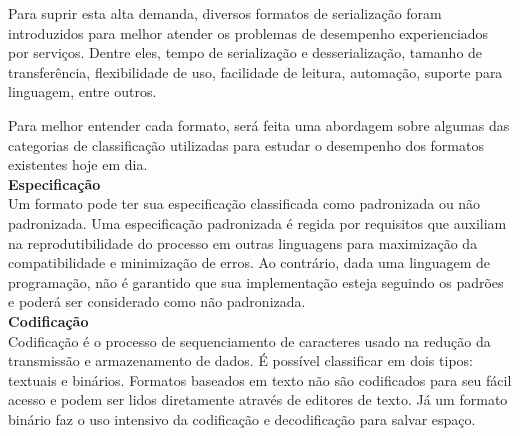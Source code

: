 Para suprir esta alta demanda, diversos formatos de serialização foram introduzidos para melhor atender os problemas de desempenho experienciados por serviços. Dentre eles, tempo de serialização e desserialização, tamanho de transferência, flexibilidade de uso, facilidade de leitura, automação, suporte para linguagem, entre outros. \cite{Guller2016}

\begin{table}[ht!]
  \centering
  \caption{Comparação de formatos de serialização}
\end{table}

Para melhor entender cada formato, será feita uma abordagem sobre algumas das categorias de classificação utilizadas para estudar o desempenho dos formatos existentes hoje em dia. \\

\textbf{Especificação} \\

Um formato pode ter sua especificação classificada como padronizada ou não padronizada. Uma especificação padronizada é regida por requisitos que auxiliam na reprodutibilidade do processo em outras linguagens para maximização da compatibilidade e minimização de erros. Ao contrário, dada uma linguagem de programação, não é garantido que sua implementação esteja seguindo os padrões e poderá ser considerado como não padronizada. \cite{McDermid1991} \\

\textbf{Codificação} \\

Codificação é o processo de sequenciamento de caracteres usado na redução da transmissão e armazenamento de dados. É possível classificar em dois tipos: textuais e binários. Formatos baseados em texto não são codificados para seu fácil acesso e podem ser lidos diretamente através de editores de texto. Já um formato binário faz o uso intensivo da codificação e decodificação para salvar espaço. \cite{Queiros2014} \\

